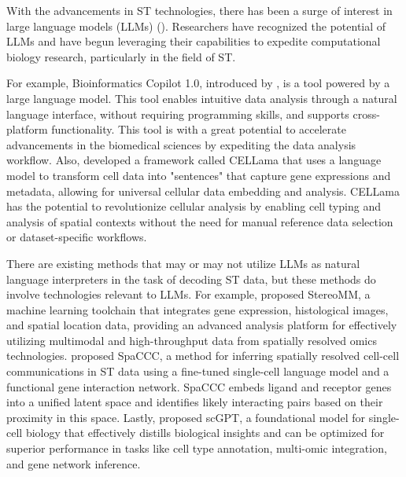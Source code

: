 \documentclass{article}
\begin{document}
With the advancements in ST technologies, there has been a surge of interest in large language models (LLMs) (\cite{Devlin:2018, Brown:2020}). Researchers have recognized the potential of LLMs and have begun leveraging their capabilities to expedite computational biology research, particularly in the field of ST.

For example, Bioinformatics Copilot 1.0, introduced by \cite{Wang:2024}, is a tool powered by a large language model. This tool enables intuitive data analysis through a natural language interface, without requiring programming skills, and supports cross-platform functionality. This tool is with a great potential to accelerate advancements in the biomedical sciences by expediting the data analysis workflow. Also, \cite{Choi:2024} developed a framework called CELLama that uses a language model to transform cell data into "sentences" that capture gene expressions and metadata, allowing for universal cellular data embedding and analysis. CELLama has the potential to revolutionize cellular analysis by enabling cell typing and analysis of spatial contexts without the need for manual reference data selection or dataset-specific workflows.

There are existing methods that may or may not utilize LLMs as natural language interpreters in the task of decoding ST data, but these methods do involve technologies relevant to LLMs. For example, \cite{Luo:2024} proposed StereoMM, a machine learning toolchain that integrates gene expression, histological images, and spatial location data, providing an advanced analysis platform for effectively utilizing multimodal and high-throughput data from spatially resolved omics technologies. \cite{Ji:2024} proposed SpaCCC, a method for inferring spatially resolved cell-cell communications in ST data using a fine-tuned single-cell language model and a functional gene interaction network. SpaCCC embeds ligand and receptor genes into a unified latent space and identifies likely interacting pairs based on their proximity in this space. Lastly, \cite{Cui:2024} proposed scGPT, a foundational model for single-cell biology that effectively distills biological insights and can be optimized for superior performance in tasks like cell type annotation, multi-omic integration, and gene network inference.
\end{document}
